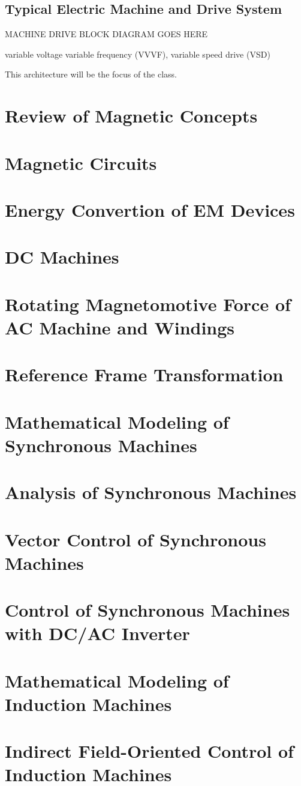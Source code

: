 \documentclass[12pt]{notes}
\begin{document}
\subsection{Typical Electric Machine and Drive System}
MACHINE DRIVE BLOCK DIAGRAM GOES HERE

variable voltage variable frequency (VVVF), variable speed drive (VSD)

This architecture will be the focus of the class.

\section{Review of Magnetic Concepts}
\section{Magnetic Circuits}
\section{Energy Convertion of EM Devices}
\section{DC Machines}
\section{Rotating Magnetomotive Force of AC Machine and Windings}
\section{Reference Frame Transformation}
\section{Mathematical Modeling of Synchronous Machines}
\section{Analysis of Synchronous Machines}
\section{Vector Control of Synchronous Machines}
\section{Control of Synchronous Machines with DC/AC Inverter}
\section{Mathematical Modeling of Induction Machines}
\section{Indirect Field-Oriented Control of Induction Machines}

\printbibliography
\end{document}
